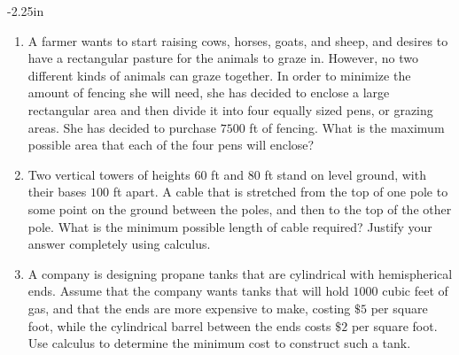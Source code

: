 \begin{adjustwidth*}{}{-2.25in}
\setlength{\columnsep}{25pt}
\begin{multicols*}{2}\small

\begin{enumerate}[1),start=18]
	\item A farmer wants to start raising cows, horses, goats, and sheep, and desires to have a rectangular pasture for the animals to graze in.  However, no two different kinds of animals can graze together.  In order to minimize the amount of fencing she will need, she has decided to enclose a large rectangular area and then divide it into four equally sized pens, or grazing areas.  She has decided to purchase $7500$ ft of fencing.  What is the maximum possible area that each of the four pens will enclose?
	\item Two vertical towers of heights $60$ ft and $80$ ft stand on level ground, with their bases $100$ ft apart.  A cable that is stretched from the top of one pole to some point on the ground between the poles, and then to the top of the other pole.   What is the minimum possible length of cable required?  Justify your answer completely using calculus.
	\item A company is designing propane tanks that are cylindrical with hemispherical ends.   Assume that the company wants tanks that will hold $1000$ cubic feet of gas, and that the ends are more expensive to make, costing $\$5$ per square foot, while the cylindrical barrel between the ends costs $\$2$ per square foot.  Use calculus to determine the minimum cost to construct such a tank.
\end{enumerate}

\end{multicols*}
\end{adjustwidth*}

\afterexercises